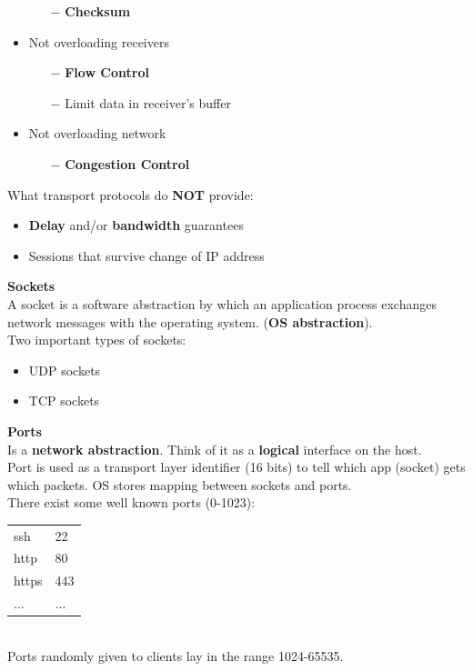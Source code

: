 \documentclass[a4paper, fontsize=8pt, landscape, DIV=1]{scrartcl}
\begin{document}
\begin{multicols*}{4}
\begin{itemize}[noitemsep]
\begin{itemize}
				\item[$-$] \textbf{Checksum}
			\end{itemize}
			\item Not overloading receivers
			\begin{itemize}
				\item[$-$] \textbf{Flow Control}
				\item[$-$] Limit data in receiver's buffer
			\end{itemize}
			\item Not overloading network
			\begin{itemize}
				\item[$-$] \textbf{Congestion Control}
			\end{itemize}
		\end{itemize}
		What transport protocols do \textbf{NOT} provide:
		\begin{itemize}[noitemsep]
			\item \textbf{Delay} and/or \textbf{bandwidth} guarantees
			\item Sessions that survive change of IP address
		\end{itemize}
		\textbf{Sockets}\\
		A socket is a software abstraction by which an application process exchanges network messages with the operating system. (\textbf{OS abstraction}).\\
		Two important types of sockets: 
		\begin{itemize}[noitemsep]
			\item UDP sockets
			\item TCP sockets
		\end{itemize}
		\par 
		
		\textbf{Ports}\\
		Is a \textbf{network abstraction}. Think of it as a \textbf{logical} interface on the host.\\
		Port is used as a transport layer identifier (16 bits) to tell which app (socket) gets which packets. OS stores mapping between sockets and ports.\\
		There exist some well known ports (0-1023):
		\begin{tabular}{l l}
			ssh & 22\\
			http & 80\\
			https & 443\\
			... & ...\\
		\end{tabular}\\
		Ports randomly given to clients lay in the range 1024-65535. 

\end{multicols*}
\end{document}
